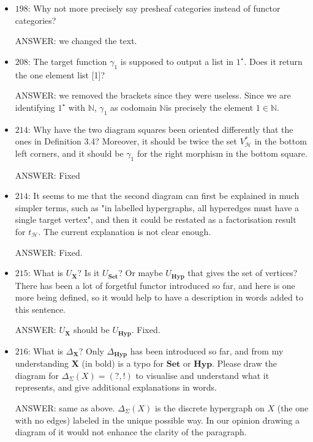 \documentclass[english,11pt,a4paper]{article}
\begin{document}
\begin{itemize}
\item $198$: Why not more precisely say presheaf categories instead of functor categories?

ANSWER: we changed the text.

\item $208$: The target function $\gamma_1$ is supposed to output a list in $1^\star$. Does it return the one element list [1]?

ANSWER: we removed the brackets since they were useless. Since we are identifying $1^\star$ with $\mathbb{N}$, $\gamma_1$ as codomain $\mathbb{N}$is precisely the element $1\in \mathbb{N}$.

\item $214$: Why have the two diagram squares been oriented differently that the ones in Definition 3.4? Moreover, it should be twice the set $V_\mathcal{H}^*$ in the bottom left corners, and it should be $\gamma_1$ for the right morphism in the bottom square.

ANSWER: Fixed

 \item $214$: It seems to me that the second diagram can first be explained in much simpler terms, such as "in labelled hypergraphs, all hyperedges must have a single target vertex", and then it could be restated as a factorisation result for $t_\mathcal{H}$. The current explanation is not clear enough.
 
 ANSWER: Fixed.
 
 \item $215$: What is $U_{\mathbf{X}}$? Is it $U_{\mathbf{Set}}$? Or maybe $U_{\mathbf{Hyp}}$ that gives the set of vertices? There has been a lot of forgetful functor introduced so far, and here is one more being defined, so it would help to have a description in words added to this sentence.
 
 ANSWER: $U_{\mathbf{X}}$ should be $U_{\mathbf{Hyp}}$. Fixed.
 
 \item $216$: What is $\Delta_{\mathbf{X}}$? Only $\Delta_{\mathbf{Hyp}}$ has been introduced so far, and from my understanding $\mathbf{X}$ (in bold) is a typo for $\mathbf{Set}$ or $\mathbf{Hyp}$. Please draw the diagram for $\Delta_\Sigma(X) = (?,!)$ to visualise and understand what it represents, and give additional explanations in words. 

ANSWER: same as above. $\Delta_\Sigma(X)$ is the discrete hypergraph on $X$ (the one with no edges) labeled in the unique possible way. In our opinion drawing a diagram of it would not enhance the clarity of the paragraph.


\end{itemize}
\end{document}
